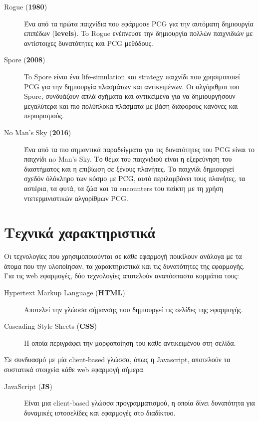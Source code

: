 \begin{description}
\item [Rogue (\textbf{1980})] Ένα από τα πρώτα παιχνίδια που εφάρμοσε PCG για την αυτόματη δημιουργία επιπέδων (\textbf{levels}). To Rogue ενέπνευσε την δημιουργία πολλών παιχνιδιών με αντίστοιχες δυνατότητες και PCG μεθόδους.

\item [Spore (\textbf{2008})] To Spore είναι ένα life-simulation και strategy παιχνίδι που χρησιμοποιεί PCG για την δημιουργία πλασμάτων και αντικειμένων. Οι αλγόριθμοι του Spore, συνδυάζουν απλά σχήματα και αντικείμενα για να δημιουργήσουν μεγαλύτερα και πιο πολύπλοκα πλάσματα με βάση διάφορους κανόνες και περιορισμούς. 

\item [No Man's Sky (\textbf{2016})] Ένα από τα πιο σημαντικά παραδείγματα για τις δυνατότητες του PCG είναι το παιχνίδι no Man's Sky. Το θέμα του παιχνιδιού είναι η εξερεύνηση του διαστήματος και η επιβίωση σε ξένους πλανήτες. Το παιχνίδι δημιουργεί σχεδόν όλόκληρο των κόσμο με PCG, αυτό περιλαμβάνει τους πλανήτες, τα αστέρια, τα φυτά, τα ζώα και τα encounters του παίκτη με τη χρήση ντετερμινιστικών αλγορίθμων PCG.
\end{description}


\section{Τεχνικά χαρακτηριστικά}

Οι τεχνολογίες που χρησιμοποιούνται σε κάθε εφαρμογή ποικίλουν ανάλογα με τα άτομα που την υλοποίησαν, τα χαρακτηριστικά και τις δυνατότητες της εφαρμογής.
\newline
Για τις web εφαρμογές, δύο τεχνολογίες αποτελούν αναπόσπαστα κομμάτια τους:

\begin{description}
\item [Hypertext Markup Language (\textbf{HTML})] Αποτελεί την γλώσσα σήμανσης που δημιουργεί τις σελίδες της εφαρμογής.

\item [Cascading Style Sheets (\textbf{CSS})] Η οποία περιγράφει την μορφοποίηση του κάθε αντικειμένου στη σελίδα. 
\end{description}


Σε συνδυασμό με μία client-based γλώσσα, όπως η Javascript, αποτελούν τα συστατικά στοιχεία κάθε web εφαρμογή σήμερα.

\begin{description}
\item [JavaScript (\textbf{JS})] Είναι μια client-based γλώσσα προγραμματισμού, η οποία δίνει δυνατότητα για δυναμικές ιστοσελίδες και εφαρμογές στο διαδίκτυο.
\end{description}

